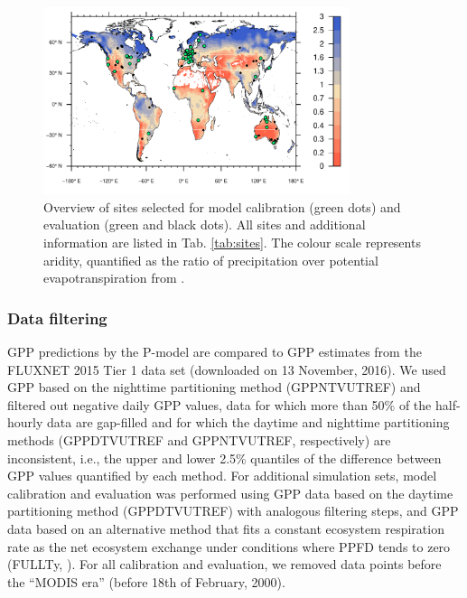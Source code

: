 \documentclass{myreport}
\begin{document}
\begin{figure}[!ht]
    \centering
    \includegraphics[width=0.8\textwidth]{fig/map_sites.pdf}
    \caption{Overview of sites selected for model calibration (green dots) and evaluation (green and black dots). All sites and additional information are listed in Tab. \ref{tab:sites}. The colour scale represents aridity, quantified as the ratio of precipitation over potential evapotranspiration from \citet{greve14}.}
    \label{fig:map_sites}
\end{figure}

\label{sec:sites}

\subsubsection{Data filtering}
\label{sec:datafiltering}
GPP predictions by the P-model are compared to GPP estimates from the FLUXNET 2015 Tier 1 data set (downloaded on 13 November, 2016). We used GPP based on the nighttime partitioning method \citep{Reichstein2005-mp} (GPP\textunderscore NT\textunderscore VUT\textunderscore REF) and filtered out negative daily GPP values, data for which more than 50\% of the half-hourly data are gap-filled and for which the daytime and nighttime partitioning methods (GPP\textunderscore DT\textunderscore VUT\textunderscore REF and GPP\textunderscore NT\textunderscore VUT\textunderscore REF, respectively) are inconsistent, i.e., the upper and lower 2.5\% quantiles of the difference between GPP values quantified by each method. For additional simulation sets, model calibration and evaluation was performed using GPP data based on the daytime partitioning method (GPP\textunderscore DT\textunderscore VUT\textunderscore REF) \citep{lasslop10} with analogous filtering steps, and GPP data based on an alternative method that fits a constant ecosystem respiration rate as the net ecosystem exchange under conditions where PPFD tends to zero (FULL\textunderscore Ty, \citet{wang17natpl}). For all calibration and evaluation, we removed data points before the ``MODIS era'' (before 18th of February, 2000).
\end{document}
